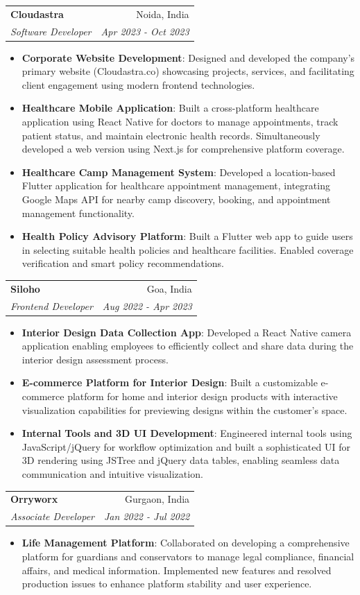 \documentclass[letterpaper,10pt]{article}
\makeatletter
\newcommand{\resumeItem}[2]{
  \item\small{
    \textbf{#1}{: #2}\par\vspace{-2pt}
  }
}
\newcommand{\resumeSubheading}[4]{
  \vspace{-1pt}\item
    \begin{tabular*}{0.97\textwidth}{l@{\extracolsep{\fill}}r}
      \textbf{#1} & #2 \\
      \textit{\small#3} & \textit{\small #4} \\
    \end{tabular*}\vspace{-5pt}
}
\newcommand{\resumeItemListStart}{\begin{itemize}}
\newcommand{\resumeItemListEnd}{\end{itemize}\vspace{-5pt}}
\makeatother
\begin{document}
    \resumeSubheading{Cloudastra}{Noida, India}
      {Software Developer}{Apr 2023 - Oct 2023}
      \resumeItemListStart
        \resumeItem{Corporate Website Development}
          {Designed and developed the company's primary website (Cloudastra.co) showcasing projects, services, and facilitating client engagement using modern frontend technologies.}
        \resumeItem{Healthcare Mobile Application}
          {Built a cross-platform healthcare application using React Native for doctors to manage appointments, track patient status, and maintain electronic health records. Simultaneously developed a web version using Next.js for comprehensive platform coverage.}
        \resumeItem{Healthcare Camp Management System}
          {Developed a location-based Flutter application for healthcare appointment management, integrating Google Maps API for nearby camp discovery, booking, and appointment management functionality.}
        \resumeItem{Health Policy Advisory Platform}
          {Built a Flutter web app to guide users in selecting suitable health policies and healthcare facilities. Enabled coverage verification and smart policy recommendations.}
      \resumeItemListEnd

    \resumeSubheading{Siloho}{Goa, India}
      {Frontend Developer}{Aug 2022 - Apr 2023}
      \resumeItemListStart
        \resumeItem{Interior Design Data Collection App}
          {Developed a React Native camera application enabling employees to efficiently collect and share data during the interior design assessment process.}
        \resumeItem{E-commerce Platform for Interior Design}
          {Built a customizable e-commerce platform for home and interior design products with interactive visualization capabilities for previewing designs within the customer's space.}
        \resumeItem{Internal Tools and 3D UI Development}
          {Engineered internal tools using JavaScript/jQuery for workflow optimization and built a sophisticated UI for 3D rendering using JSTree and jQuery data tables, enabling seamless data communication and intuitive visualization.}
      \resumeItemListEnd

    \resumeSubheading{Orryworx}{Gurgaon, India}
      {Associate Developer}{Jan 2022 - Jul 2022}
      \resumeItemListStart
        \resumeItem{Life Management Platform}
          {Collaborated on developing a comprehensive platform for guardians and conservators to manage legal compliance, financial affairs, and medical information. Implemented new features and resolved production issues to enhance platform stability and user experience.}
      \resumeItemListEnd
\end{document}
